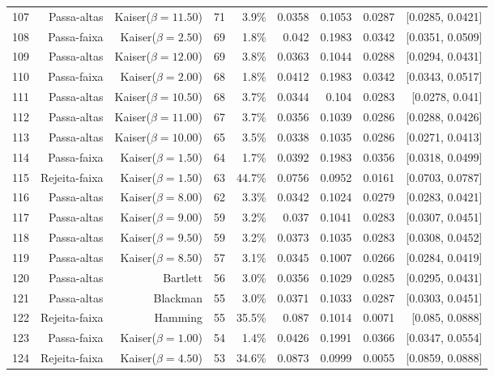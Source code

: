 \begin{longtable}{lrrrrrrrr}
    107 & Passa-altas & Kaiser($\beta=11.50$) & 71 & 3.9\% & 0.0358 & 0.1053 & 0.0287 & [0.0285, 0.0421] \\
    108 & Passa-faixa & Kaiser($\beta=2.50$) & 69 & 1.8\% & 0.042 & 0.1983 & 0.0342 & [0.0351, 0.0509] \\
    109 & Passa-altas & Kaiser($\beta=12.00$) & 69 & 3.8\% & 0.0363 & 0.1044 & 0.0288 & [0.0294, 0.0431] \\
    110 & Passa-faixa & Kaiser($\beta=2.00$) & 68 & 1.8\% & 0.0412 & 0.1983 & 0.0342 & [0.0343, 0.0517] \\
    111 & Passa-altas & Kaiser($\beta=10.50$) & 68 & 3.7\% & 0.0344 & 0.104 & 0.0283 & [0.0278, 0.041] \\
    112 & Passa-altas & Kaiser($\beta=11.00$) & 67 & 3.7\% & 0.0356 & 0.1039 & 0.0286 & [0.0288, 0.0426] \\
    113 & Passa-altas & Kaiser($\beta=10.00$) & 65 & 3.5\% & 0.0338 & 0.1035 & 0.0286 & [0.0271, 0.0413] \\
    114 & Passa-faixa & Kaiser($\beta=1.50$) & 64 & 1.7\% & 0.0392 & 0.1983 & 0.0356 & [0.0318, 0.0499] \\
    115 & Rejeita-faixa & Kaiser($\beta=1.50$) & 63 & 44.7\% & 0.0756 & 0.0952 & 0.0161 & [0.0703, 0.0787] \\
    116 & Passa-altas & Kaiser($\beta=8.00$) & 62 & 3.3\% & 0.0342 & 0.1024 & 0.0279 & [0.0283, 0.0421] \\
    117 & Passa-altas & Kaiser($\beta=9.00$) & 59 & 3.2\% & 0.037 & 0.1041 & 0.0283 & [0.0307, 0.0451] \\
    118 & Passa-altas & Kaiser($\beta=9.50$) & 59 & 3.2\% & 0.0373 & 0.1035 & 0.0283 & [0.0308, 0.0452] \\
    119 & Passa-altas & Kaiser($\beta=8.50$) & 57 & 3.1\% & 0.0345 & 0.1007 & 0.0266 & [0.0284, 0.0419] \\
    120 & Passa-altas & Bartlett & 56 & 3.0\% & 0.0356 & 0.1029 & 0.0285 & [0.0295, 0.0431] \\
    121 & Passa-altas & Blackman & 55 & 3.0\% & 0.0371 & 0.1033 & 0.0287 & [0.0303, 0.0451] \\
    122 & Rejeita-faixa & Hamming & 55 & 35.5\% & 0.087 & 0.1014 & 0.0071 & [0.085, 0.0888] \\
    123 & Passa-faixa & Kaiser($\beta=1.00$) & 54 & 1.4\% & 0.0426 & 0.1991 & 0.0366 & [0.0347, 0.0554] \\
    124 & Rejeita-faixa & Kaiser($\beta=4.50$) & 53 & 34.6\% & 0.0873 & 0.0999 & 0.0055 & [0.0859, 0.0888] \\

\end{longtable}

